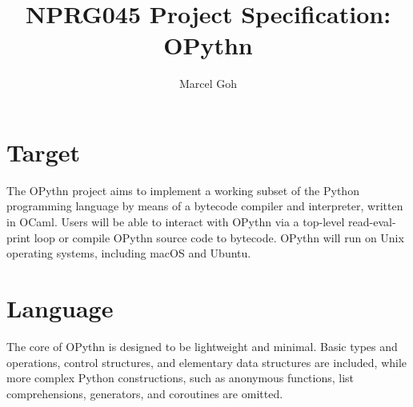 \documentclass[11pt, twoside]{article}
\begin{document}
\title{\Huge{\textbf{NPRG045 Project Specification: OPythn}}}
\author{\Large{Marcel Goh}}
\clearpage\maketitle
\thispagestyle{empty}
\newpage
\setcounter{page}{1}

\section{Target}
    The OPythn project aims to implement a working subset of the Python programming language by means of a bytecode compiler and interpreter, written in OCaml. Users will be able to interact with OPythn via a top-level read-eval-print loop or compile OPythn source code to bytecode. OPythn will run on Unix operating systems, including macOS and Ubuntu.
\section{Language}
    The core of OPythn is designed to be lightweight and minimal. Basic types and operations, control structures, and elementary data structures are included, while more complex Python constructions, such as anonymous functions, list comprehensions, generators, and coroutines are omitted.
\end{document}
